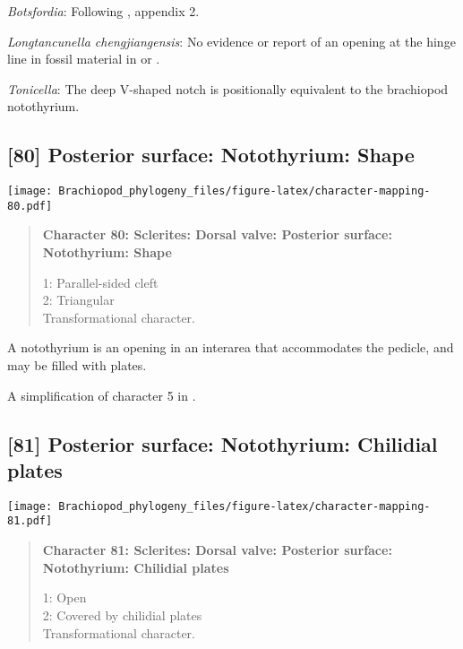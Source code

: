 \documentclass[openany]{book}
\theoremstyle{definition}
\theoremstyle{definition}
\theoremstyle{definition}
\theoremstyle{remark}
\begin{document}
\hypertarget{Botsfordia-coding-79}{}
\emph{Botsfordia}: Following \citet{Williams1998Thediversity}, appendix
2.

\hypertarget{Longtancunella_chengjiangensis-coding-79}{}
\emph{Longtancunella chengjiangensis}: No evidence or report of an
opening at the hinge line in fossil material in
\citet{Zhang2007Agregarious} or \citet{Zhang2011Theexceptionally}.

\hypertarget{Tonicella-coding-79}{}
\emph{Tonicella}: The deep V-shaped notch \citep[fig. 8]{Schwabe2010} is
positionally equivalent to the brachiopod notothyrium.

\subsection*{{[}80{]} Posterior surface: Notothyrium:
Shape}\label{posterior-surface-notothyrium-shape}

\texttt{[image: Brachiopod\_phylogeny\_files/figure-latex/character-mapping-80.pdf]}

\begin{quote}
\textbf{Character 80: Sclerites: Dorsal valve: Posterior surface:
Notothyrium: Shape}

1: Parallel-sided cleft\\
2: Triangular\\
Transformational character.
\end{quote}

A notothyrium is an opening in an interarea that accommodates the
pedicle, and may be filled with plates.

A simplification of character 5 in
\citet{Bassett2001Functionalmorphology}.

\subsection*{{[}81{]} Posterior surface: Notothyrium: Chilidial
plates}\label{posterior-surface-notothyrium-chilidial-plates}

\texttt{[image: Brachiopod\_phylogeny\_files/figure-latex/character-mapping-81.pdf]}

\begin{quote}
\textbf{Character 81: Sclerites: Dorsal valve: Posterior surface:
Notothyrium: Chilidial plates}

1: Open\\
2: Covered by chilidial plates\\
Transformational character.
\end{quote}
\end{document}
